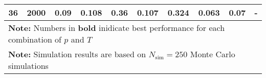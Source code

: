 \begin{landscape}
\begin{table}[p]
\begin{tabular}{cccccccccc}
	 36  & 2000 &        0.09        & 0.108                     &            0.36             &           0.107           &            0.324            & \textbf{0.063}         &           0.07           & -                 \\
	\hline
	\hline
    \multicolumn{10}{l}{\textbf{Note:} Numbers in \textbf{bold} inidicate best performance for each combination of $p$ and $T$} \\
    \multicolumn{10}{l}{\textbf{Note:} Simulation results are based on $N_\text{sim} = 250$ Monte Carlo simulations}
    \end{tabular}
    \end{table}
    \egroup
\end{landscape}
    